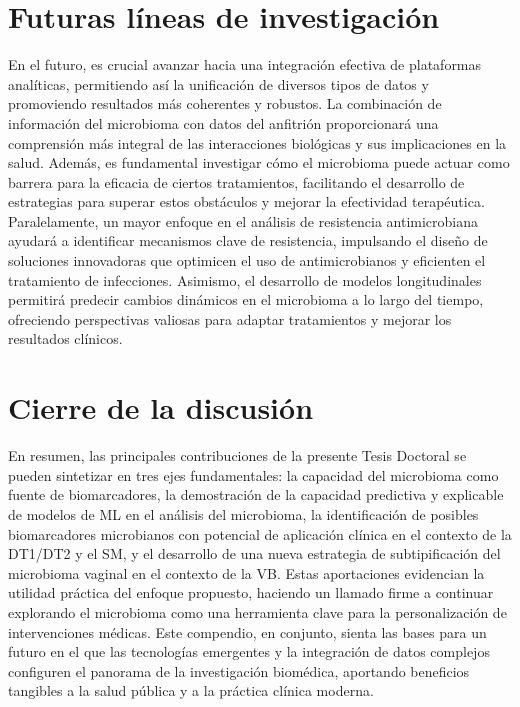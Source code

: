\section{Futuras líneas de investigación} 

En el futuro, es crucial avanzar hacia una integración efectiva de plataformas analíticas, permitiendo así la unificación de diversos tipos de datos y promoviendo resultados más coherentes y robustos. La combinación de información del microbioma con datos del anfitrión proporcionará una comprensión más integral de las interacciones biológicas y sus implicaciones en la salud. Además, es fundamental investigar cómo el microbioma puede actuar como barrera para la eficacia de ciertos tratamientos, facilitando el desarrollo de estrategias para superar estos obstáculos y mejorar la efectividad terapéutica. Paralelamente, un mayor enfoque en el análisis de resistencia antimicrobiana ayudará a identificar mecanismos clave de resistencia, impulsando el diseño de soluciones innovadoras que optimicen el uso de antimicrobianos y eficienten el tratamiento de infecciones. Asimismo, el desarrollo de modelos longitudinales permitirá predecir cambios dinámicos en el microbioma a lo largo del tiempo, ofreciendo perspectivas valiosas para adaptar tratamientos y mejorar los resultados clínicos.


\section{Cierre de la discusión}


En resumen, las principales contribuciones de la presente Tesis Doctoral se pueden sintetizar en tres ejes fundamentales: la capacidad del microbioma como fuente de biomarcadores, la demostración de la capacidad predictiva y explicable de modelos de ML en el análisis del microbioma, la identificación de  posibles biomarcadores microbianos con potencial de aplicación clínica en el contexto de la DT1/DT2 y el SM, y el desarrollo de una nueva estrategia de subtipificación del microbioma vaginal en el contexto de la VB. Estas aportaciones evidencian la utilidad práctica del enfoque propuesto, haciendo un llamado firme a continuar explorando el microbioma como una herramienta clave para la personalización de intervenciones médicas. Este compendio, en conjunto, sienta las bases para un futuro en el que las tecnologías emergentes y la integración de datos complejos configuren el panorama de la investigación biomédica, aportando beneficios tangibles a la salud pública y a la práctica clínica moderna.


